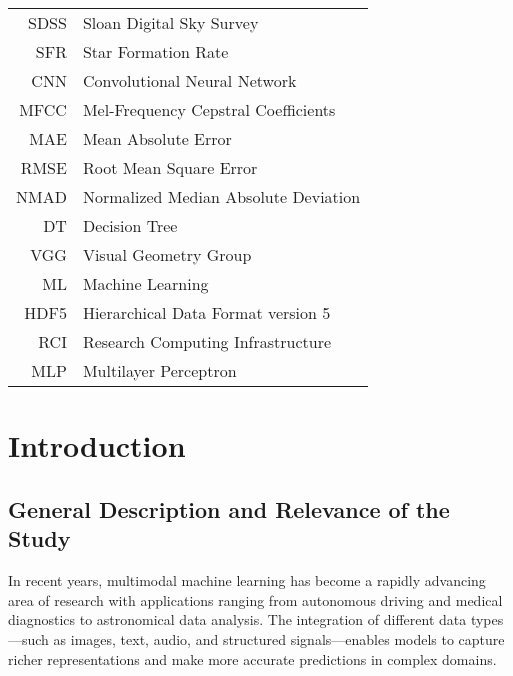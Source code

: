 \documentclass[english,bachelor,oneside]{ctufit-thesis}
\begin{document}
\printabstractpage

\tableofcontents
\listoffigures
\begingroup
\let\clearpage\relax
\listoftables
\thectufitlistingscommand
\endgroup

\chapter{\thectufitabbreviationlabel}
\begin{tabular}{rl}
SDSS & Sloan Digital Sky Survey \\
SFR & Star Formation Rate \\
CNN & Convolutional Neural Network \\
MFCC & Mel-Frequency Cepstral Coefficients \\
MAE & Mean Absolute Error \\
RMSE & Root Mean Square Error \\
NMAD & Normalized Median Absolute Deviation \\
DT & Decision Tree \\
VGG & Visual Geometry Group \\
ML & Machine Learning \\
HDF5 & Hierarchical Data Format version 5 \\
RCI & Research Computing Infrastructure \\
MLP & Multilayer Perceptron \\
\end{tabular}

\resumeTOCentries
\mainmatter\mainmatterinit

\chapter{Introduction}

\section{General Description and Relevance of the Study}

In recent years, multimodal machine learning has become a rapidly advancing area of research with applications ranging from autonomous driving and medical diagnostics to astronomical data analysis. The integration of different data types—such as images, text, audio, and structured signals—enables models to capture richer representations and make more accurate predictions in complex domains.
\end{document}
